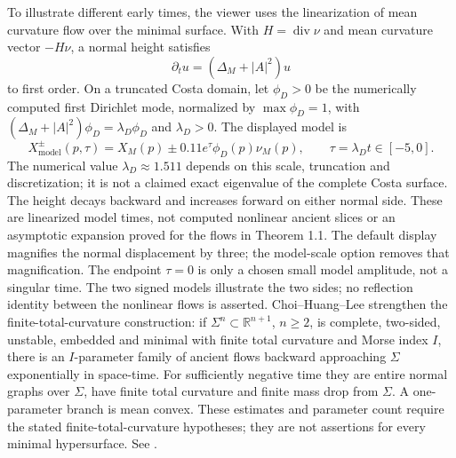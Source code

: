 \begin{example}
To illustrate different early times, the viewer uses the linearization of mean curvature flow over the minimal surface. With $H=\operatorname{div}\nu$ and mean curvature vector $-H\nu$, a normal height satisfies
\[
 \partial_t u=(\Delta_M+|A|^2)u
\]
to first order. On a truncated Costa domain, let $\phi_D>0$ be the numerically computed first Dirichlet mode, normalized by $\max\phi_D=1$, with $(\Delta_M+|A|^2)\phi_D=\lambda_D\phi_D$ and $\lambda_D>0$. The displayed model is
\[
 X_{\mathrm{model}}^{\pm}(p,\tau)
 =X_M(p)\pm0.11e^\tau\phi_D(p)\nu_M(p),
 \qquad \tau=\lambda_D t\in[-5,0].
\]
The numerical value $\lambda_D\approx1.511$ depends on this scale, truncation and discretization; it is not a claimed exact eigenvalue of the complete Costa surface. The height decays backward and increases forward on either normal side. These are linearized model times, not computed nonlinear ancient slices or an asymptotic expansion proved for the flows in Theorem 1.1. The default display magnifies the normal displacement by three; the model-scale option removes that magnification. The endpoint $\tau=0$ is only a chosen small model amplitude, not a singular time. The two signed models illustrate the two sides; no reflection identity between the nonlinear flows is asserted.
Choi--Huang--Lee strengthen the finite-total-curvature construction: if $\Sigma^n\subset\mathbb R^{n+1}$, $n\ge2$, is complete, two-sided, unstable, embedded and minimal with finite total curvature and Morse index $I$, there is an $I$-parameter family of ancient flows backward approaching $\Sigma$ exponentially in space-time. For sufficiently negative time they are entire normal graphs over $\Sigma$, have finite total curvature and finite mass drop from $\Sigma$. A one-parameter branch is mean convex. These estimates and parameter count require the stated finite-total-curvature hypotheses; they are not assertions for every minimal hypersurface. See \cite{CatChoiHuangLee2025}.
\end{example}

